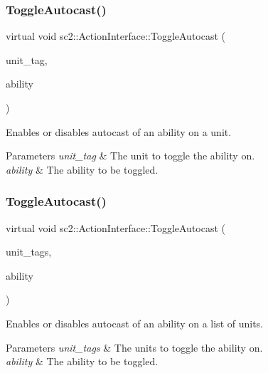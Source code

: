 \subsubsection{\texorpdfstring{Toggle\+Autocast()}{ToggleAutocast()}\hspace{0.1cm}{\footnotesize\ttfamily [1/2]}}
{\footnotesize\ttfamily virtual void sc2\+::\+Action\+Interface\+::\+Toggle\+Autocast (\begin{DoxyParamCaption}\item[{Tag}]{unit\+\_\+tag,  }\item[{\hyperlink{classsc2_1_1_s_c2_type}{Ability\+ID}}]{ability }\end{DoxyParamCaption})\hspace{0.3cm}{\ttfamily [pure virtual]}}

Enables or disables autocast of an ability on a unit. 
\begin{DoxyParams}{Parameters}
{\em unit\+\_\+tag} & The unit to toggle the ability on. \\
\hline
{\em ability} & The ability to be toggled. \\
\hline
\end{DoxyParams}
\mbox{\label{classsc2_1_1_action_interface_ab3990c306215b3cb8d5e62533f72db62}} 
\subsubsection{\texorpdfstring{Toggle\+Autocast()}{ToggleAutocast()}\hspace{0.1cm}{\footnotesize\ttfamily [2/2]}}
{\footnotesize\ttfamily virtual void sc2\+::\+Action\+Interface\+::\+Toggle\+Autocast (\begin{DoxyParamCaption}\item[{const std\+::vector$<$ Tag $>$ \&}]{unit\+\_\+tags,  }\item[{\hyperlink{classsc2_1_1_s_c2_type}{Ability\+ID}}]{ability }\end{DoxyParamCaption})\hspace{0.3cm}{\ttfamily [pure virtual]}}

Enables or disables autocast of an ability on a list of units. 
\begin{DoxyParams}{Parameters}
{\em unit\+\_\+tags} & The units to toggle the ability on. \\
\hline
{\em ability} & The ability to be toggled. \\
\hline
\end{DoxyParams}
\mbox{\label{classsc2_1_1_action_interface_ad401d286fabc349133f27e0fc29099f2}} 

